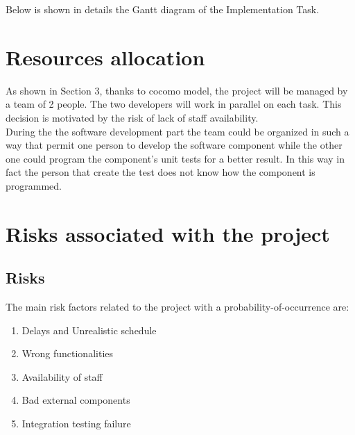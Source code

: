 \documentclass{article}
\begin{document}
		Below is shown in details the Gantt diagram of the Implementation Task.\\
		\begin{minipage}{\linewidth}
			\vspace{5mm}
			\vspace{5mm}
		\end{minipage}
		
	\section{Resources allocation}
	As shown in Section 3, thanks to cocomo model, the project will be managed by a team of 2 people. The two developers will work in parallel on each task. This decision is motivated by the risk of lack of staff availability. \\
	During the the software development part the team could be organized in such a way that permit one person to develop the software component while the other one could program the component's unit tests for a better result. In this way in fact the person that create the test does not know how the component is programmed.
	\pagebreak
		
	\section{Risks associated with the project}
		\subsection{Risks}
		The main risk factors related to the project with a probability-of-occurrence are:
		\begin{enumerate}
			\item Delays and Unrealistic schedule
			\item Wrong functionalities
			\item Availability of staff
			\item Bad external components
			\item Integration testing failure
		\end{enumerate}
\end{document}
